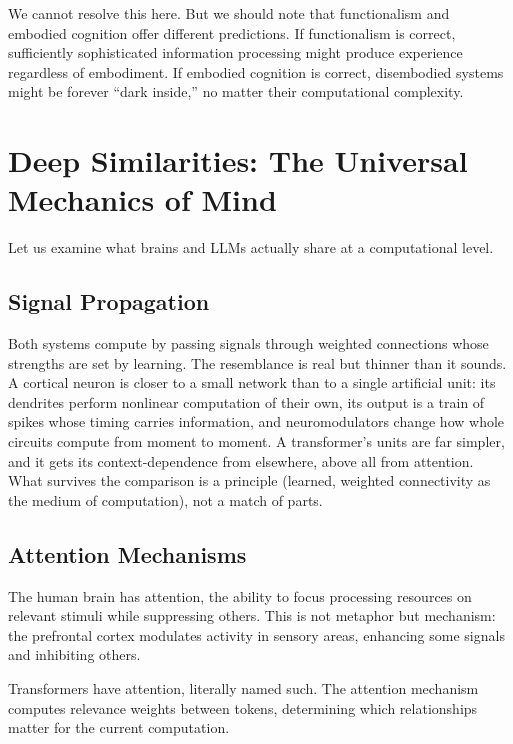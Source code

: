 \documentclass[11pt,letterpaper]{article}
\begin{document}
We cannot resolve this here. But we should note that functionalism and embodied cognition offer different predictions. If functionalism is correct, sufficiently sophisticated information processing might produce experience regardless of embodiment. If embodied cognition is correct, disembodied systems might be forever ``dark inside,'' no matter their computational complexity.

\section{Deep Similarities: The Universal Mechanics of Mind}

Let us examine what brains and LLMs actually share at a computational level.

\subsection{Signal Propagation}

Both systems compute by passing signals through weighted connections whose strengths are set by learning. The resemblance is real but thinner than it sounds. A cortical neuron is closer to a small network than to a single artificial unit: its dendrites perform nonlinear computation of their own, its output is a train of spikes whose timing carries information, and neuromodulators change how whole circuits compute from moment to moment. A transformer's units are far simpler, and it gets its context-dependence from elsewhere, above all from attention. What survives the comparison is a principle (learned, weighted connectivity as the medium of computation), not a match of parts.

\subsection{Attention Mechanisms}

The human brain has attention, the ability to focus processing resources on relevant stimuli while suppressing others. This is not metaphor but mechanism: the prefrontal cortex modulates activity in sensory areas, enhancing some signals and inhibiting others.

Transformers have attention, literally named such. The attention mechanism computes relevance weights between tokens, determining which relationships matter for the current computation.
\end{document}
